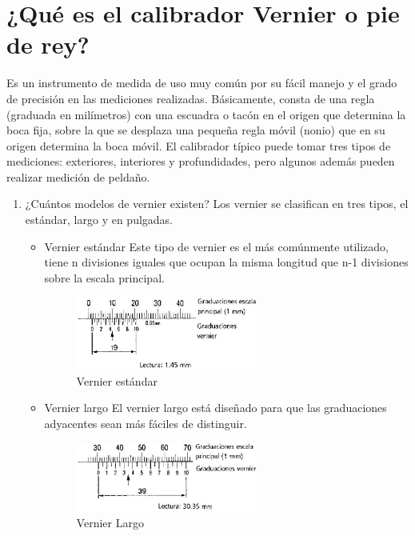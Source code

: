 \documentclass{article}
\theoremstyle{mytheoremstyle}
\theoremstyle{mytheoremstyle}
\theoremstyle{myproblemstyle}
\begin{document}
\section{¿Qué es el calibrador Vernier o pie de rey?}
Es un instrumento de medida de uso muy común por su fácil manejo y el grado de precisión en las mediciones realizadas. Básicamente, consta de una regla (graduada en milímetros) con una escuadra o tacón en el origen que determina la boca fija, sobre la que se desplaza
una pequeña regla móvil (nonio) que en su origen determina la boca móvil. El calibrador típico puede tomar tres tipos de mediciones: exteriores,
interiores y profundidades, pero algunos además pueden realizar medición de peldaño.
\begin{enumerate}
	\item ¿Cuántos modelos de vernier existen?\newline
	      Los vernier se clasifican en tres tipos, el estándar, largo y en pulgadas.
	      \begin{itemize}
		      \item Vernier estándar \newline
		            Este tipo de vernier es el más comúnmente utilizado, tiene n divisiones iguales
		            que ocupan la misma longitud que n-1 divisiones sobre la escala principal.
		            \begin{figure}[H]
			            \centering
			            \includegraphics[width=0.6\textwidth]{lectura_vernier.png}
			            \caption{Vernier estándar}
			            \label{fig:imagen2}
		            \end{figure}
	      \end{itemize}

	      \begin{itemize}
		      \item Vernier largo \newline
		            El vernier largo está diseñado para que las graduaciones adyacentes sean más
		            fáciles de distinguir.
		            \begin{figure}[H]
			            \centering
			            \includegraphics[width=0.6\textwidth]{lectura2.png}
			            \caption{Vernier Largo}
			            \label{fig:imagen2}
		            \end{figure}
	      \end{itemize}


\end{enumerate}
\end{document}
